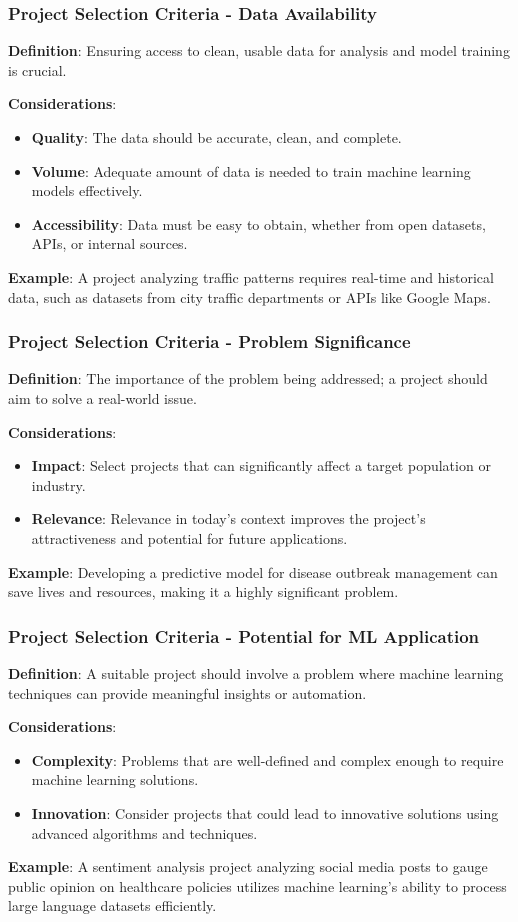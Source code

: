 \documentclass[aspectratio=169]{beamer}
\begin{document}
\begin{frame}[fragile]
  \frametitle{Project Selection Criteria - Data Availability}
  \textbf{Definition}: Ensuring access to clean, usable data for analysis and model training is crucial.

  \textbf{Considerations}:
  \begin{itemize}
    \item \textbf{Quality}: The data should be accurate, clean, and complete.
    \item \textbf{Volume}: Adequate amount of data is needed to train machine learning models effectively.
    \item \textbf{Accessibility}: Data must be easy to obtain, whether from open datasets, APIs, or internal sources.
  \end{itemize}

  \textbf{Example}:
  A project analyzing traffic patterns requires real-time and historical data, such as datasets from city traffic departments or APIs like Google Maps.
\end{frame}

\begin{frame}[fragile]
  \frametitle{Project Selection Criteria - Problem Significance}
  \textbf{Definition}: The importance of the problem being addressed; a project should aim to solve a real-world issue.

  \textbf{Considerations}:
  \begin{itemize}
    \item \textbf{Impact}: Select projects that can significantly affect a target population or industry.
    \item \textbf{Relevance}: Relevance in today’s context improves the project's attractiveness and potential for future applications.
  \end{itemize}

  \textbf{Example}:
  Developing a predictive model for disease outbreak management can save lives and resources, making it a highly significant problem.
\end{frame}

\begin{frame}[fragile]
  \frametitle{Project Selection Criteria - Potential for ML Application}
  \textbf{Definition}: A suitable project should involve a problem where machine learning techniques can provide meaningful insights or automation.

  \textbf{Considerations}:
  \begin{itemize}
    \item \textbf{Complexity}: Problems that are well-defined and complex enough to require machine learning solutions.
    \item \textbf{Innovation}: Consider projects that could lead to innovative solutions using advanced algorithms and techniques.
  \end{itemize}

  \textbf{Example}:
  A sentiment analysis project analyzing social media posts to gauge public opinion on healthcare policies utilizes machine learning's ability to process large language datasets efficiently.
\end{frame}
\end{document}
